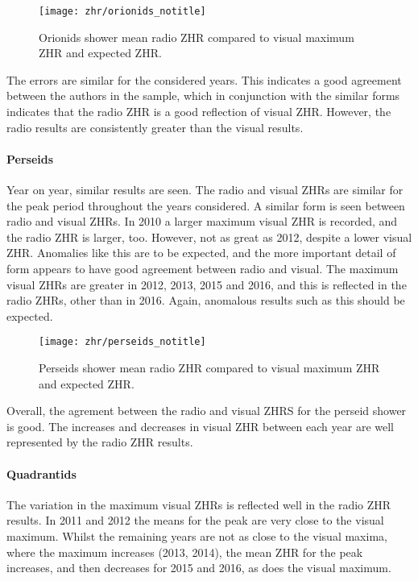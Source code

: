 \begin{figure}[h!] 
	\centering
	\texttt{[image: zhr/orionids\_notitle]} 
	\caption{Orionids shower mean radio ZHR compared to visual maximum ZHR and
	expected ZHR.}
	\label{fig:zhr:ori}	
\end{figure}

The errors are similar for the considered years. This indicates a good agreement
between the authors in the sample, which in conjunction with the similar forms
indicates that the radio ZHR is a good reflection of visual ZHR. However, the
radio results are consistently greater than the visual results. 

\paragraph{Perseids\\}

Year on year, similar results are seen. The radio and visual ZHRs are similar
for the peak period throughout the years considered. A similar form is seen
between radio and visual ZHRs. In 2010 a larger maximum visual ZHR is recorded,
and the radio ZHR is larger, too. However, not as great as 2012, despite a lower
visual ZHR. Anomalies like this are to be expected, and the more important
detail of form appears to have good agreement between radio and visual. The
maximum visual ZHRs are greater in 2012, 2013, 2015 and 2016, and this is
reflected in the radio ZHRs, other than in 2016. Again, anomalous results such
as this should be expected.

\begin{figure}[h!] 
	\centering
	\texttt{[image: zhr/perseids\_notitle]} 
	\caption{Perseids shower mean radio ZHR compared to visual maximum ZHR and
	expected ZHR.}
	\label{fig:zhr:per}	
\end{figure}

Overall, the agrement between the radio and visual ZHRS for the perseid shower
is good. The increases and decreases in visual ZHR between each year are well
represented by the radio ZHR results.

\paragraph{Quadrantids\\}

The variation in the maximum visual ZHRs is reflected well in the radio ZHR
results. In 2011 and 2012 the means for the peak are very close to the visual
maximum. Whilst the remaining years are not as close to the visual maxima, where
the maximum increases (2013, 2014), the mean ZHR for the peak increases, and
then decreases for 2015 and 2016, as does the visual maximum.

